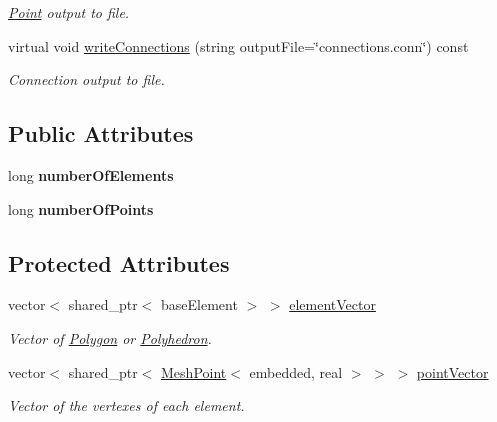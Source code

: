 \begin{DoxyCompactItemize}
\begin{DoxyCompactList}\small\item\em \hyperlink{class_point}{Point} output to file. \end{DoxyCompactList}\item 
virtual void \hyperlink{class_mesh_adb3c64b4f1420c5ed0b6a74c6d9b116b}{write\+Connections} (string output\+File=\char`\"{}connections.\+conn\char`\"{}) const \hypertarget{class_mesh_adb3c64b4f1420c5ed0b6a74c6d9b116b}{}\label{class_mesh_adb3c64b4f1420c5ed0b6a74c6d9b116b}

\begin{DoxyCompactList}\small\item\em Connection output to file. \end{DoxyCompactList}\end{DoxyCompactItemize}
\subsection*{Public Attributes}
\begin{DoxyCompactItemize}
\item 
long {\bfseries number\+Of\+Elements}\hypertarget{class_mesh_af7c23d5f0561acb3fb7fae234e5f2f32}{}\label{class_mesh_af7c23d5f0561acb3fb7fae234e5f2f32}

\item 
long {\bfseries number\+Of\+Points}\hypertarget{class_mesh_a6b2ec9290bb2a198ea28a2577a43e271}{}\label{class_mesh_a6b2ec9290bb2a198ea28a2577a43e271}

\end{DoxyCompactItemize}
\subsection*{Protected Attributes}
\begin{DoxyCompactItemize}
\item 
vector$<$ shared\+\_\+ptr$<$ base\+Element $>$ $>$ \hyperlink{class_mesh_aea48e58470e3a72fcc3ee5b26f9c5315}{element\+Vector}\hypertarget{class_mesh_aea48e58470e3a72fcc3ee5b26f9c5315}{}\label{class_mesh_aea48e58470e3a72fcc3ee5b26f9c5315}

\begin{DoxyCompactList}\small\item\em Vector of \hyperlink{class_polygon}{Polygon} or \hyperlink{class_polyhedron}{Polyhedron}. \end{DoxyCompactList}\item 
vector$<$ shared\+\_\+ptr$<$ \hyperlink{class_mesh_point}{Mesh\+Point}$<$ embedded, real $>$ $>$ $>$ \hyperlink{class_mesh_ae132c0131accc25771300cea93e26c01}{point\+Vector}\hypertarget{class_mesh_ae132c0131accc25771300cea93e26c01}{}\label{class_mesh_ae132c0131accc25771300cea93e26c01}

\begin{DoxyCompactList}\small\item\em Vector of the vertexes of each element. \end{DoxyCompactList}\end{DoxyCompactItemize}
